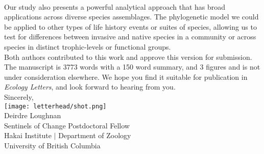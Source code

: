 \documentclass[11pt,a4paper]{article}
\begin{document}
\vspace{1.5ex}\\
Our study also presents a powerful analytical approach that has broad applications across diverse species assemblages. The phylogenetic model we could be applied to other types of life history events or suites of species, allowing us to test for differences between invasive and native species in a community or across species in distinct trophic-levels or functional groups.
\vspace{1.5ex}\\
\noindent Both authors contributed to this work and approve this version for submission. The manuscript is 3773 words with a 150 word summary, and 3 figures and is not under consideration elsewhere. We hope you find it suitable for publication in \emph{Ecology Letters}, and look forward to hearing from you. 
\vspace{1.5ex}\\
\noindent Sincerely, \\
\texttt{[image: letterhead/shot.png]} \\ 
\noindent Deirdre Loughnan\\
\noindent Sentinels of Change Postdoctoral Fellow\\ %
\noindent Hakai Institute $|$ Department of Zoology\\
\noindent University of British Columbia
\newpage
\vspace{-5ex}
% 


\newpage
\end{document}

